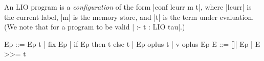 An LIO program is a \emph{configuration} of the form
|conf lcurr m t|, where |lcurr| is the current label, |m|
is the memory store, and |t| is
the term under evaluation.
%
(We note that for a program to be valid | :- t : LIO tau|.)



\begin{code}
Ep  ::= Ep t | fix Ep | if Ep then t else t 
      | Ep oplus t | v oplus Ep
E  ::= []| Ep | E >>= t 
\end{code}


